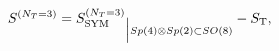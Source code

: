 \begin{equation*}
S^{(N_T = 3)} =
{S_{\rm SYM}^{(N_T = 3)}}_{\Bigr|Sp(4) \otimes Sp(2) \subset SO(8)} -
S_{\rm T},
\end{equation*}


